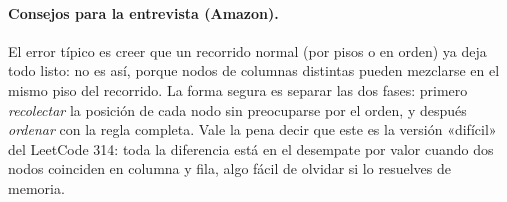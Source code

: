 \paragraph{Consejos para la entrevista (Amazon).} El error típico es creer que
un recorrido normal (por pisos o en orden) ya deja todo listo: no es así, porque
nodos de columnas distintas pueden mezclarse en el mismo piso del recorrido. La
forma segura es separar las dos fases: primero \emph{recolectar} la posición de
cada nodo sin preocuparse por el orden, y después \emph{ordenar} con la regla
completa. Vale la pena decir que este es la versión «difícil» del LeetCode 314:
toda la diferencia está en el desempate por valor cuando dos nodos coinciden en
columna y fila, algo fácil de olvidar si lo resuelves de memoria.
